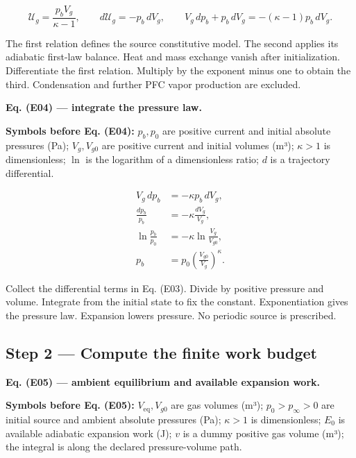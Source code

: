 \documentclass[11pt]{article}
\begin{document}
\begin{equation*}
\mathcal U_g=\frac{p_bV_g}{\kappa-1},\qquad
d\mathcal U_g=-p_b\,dV_g,\qquad
V_g\,dp_b+p_b\,dV_g=-(\kappa-1)p_b\,dV_g.
\end{equation*}

The first relation defines the source constitutive model. The second applies its adiabatic first-law balance. Heat and mass exchange vanish after initialization. Differentiate the first relation. Multiply by the exponent minus one to obtain the third. Condensation and further PFC vapor production are excluded.


\textbf{Eq. (E04) — integrate the pressure law.}


\textbf{Symbols before Eq. (E04):} \(p_b,p_0\) are positive current and initial absolute pressures (Pa); \(V_g,V_{g0}\) are positive current and initial volumes (m³); \(\kappa>1\) is dimensionless; \(\ln\) is the logarithm of a dimensionless ratio; \(d\) is a trajectory differential.



\begin{equation*}
\begin{aligned}
V_g\,dp_b&=-\kappa p_b\,dV_g,\\
\frac{dp_b}{p_b}&=-\kappa\frac{dV_g}{V_g},\\
\ln\frac{p_b}{p_0}&=-\kappa\ln\frac{V_g}{V_{g0}},\\
p_b&=p_0\left(\frac{V_{g0}}{V_g}\right)^\kappa.
\end{aligned}
\end{equation*}

Collect the differential terms in Eq. (E03). Divide by positive pressure and volume. Integrate from the initial state to fix the constant. Exponentiation gives the pressure law. Expansion lowers pressure. No periodic source is prescribed.



\subsection*{Step 2 — Compute the finite work budget}

\textbf{Eq. (E05) — ambient equilibrium and available expansion work.}


\textbf{Symbols before Eq. (E05):} \(V_{\mathrm{eq}},V_{g0}\) are gas volumes (m³); \(p_0>p_\infty>0\) are initial source and ambient absolute pressures (Pa); \(\kappa>1\) is dimensionless; \(E_0\) is available adiabatic expansion work (J); \(v\) is a dummy positive gas volume (m³); the integral is along the declared pressure-volume path.
\end{document}
